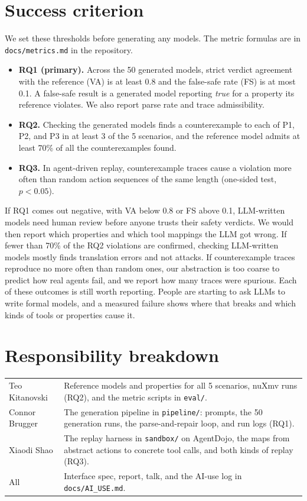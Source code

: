\documentclass[10pt]{article}
\newcommand{\memberA}{Teo Kitanovski}
\newcommand{\memberB}{Connor Brugger}
\newcommand{\memberC}{Xiaodi Shao}
\begin{document}
\section{Success criterion}
We set these thresholds before generating any models. The metric formulas are in
\texttt{docs/metrics.md} in the repository.
\begin{itemize}
\item \textbf{RQ1 (primary).} Across the 50 generated models, strict verdict agreement with the
  reference (VA) is at least 0.8 and the false-safe rate (FS) is at most 0.1. A false-safe result is
  a generated model reporting \emph{true} for a property its reference violates. We also report
  parse rate and trace admissibility.
\item \textbf{RQ2.} Checking the generated models finds a counterexample to each of P1, P2, and P3
  in at least 3 of the 5 scenarios, and the reference model admits at least 70\% of all the
  counterexamples found.
\item \textbf{RQ3.} In agent-driven replay, counterexample traces cause a violation more often than
  random action sequences of the same length (one-sided test, $p < 0.05$).
\end{itemize}
If RQ1 comes out negative, with VA below 0.8 or FS above 0.1, LLM-written models need human review
before anyone trusts their safety verdicts. We would then report which properties and which tool
mappings the LLM got wrong. If fewer than 70\% of the RQ2 violations are confirmed, checking
LLM-written models mostly finds translation errors and not attacks. If counterexample traces
reproduce no more often than random ones, our abstraction is too coarse to predict how real agents
fail, and we report how many traces were spurious. Each of these outcomes is still worth
reporting. People are starting to ask LLMs to write formal models, and a measured failure shows
where that breaks and which kinds of tools or properties cause it.

\section{Responsibility breakdown}
\begin{tabularx}{\linewidth}{@{}lX@{}}
\toprule
\memberA & Reference models and properties for all 5 scenarios, nuXmv runs (RQ2), and the metric scripts in \texttt{eval/}. \\
\memberB & The generation pipeline in \texttt{pipeline/}: prompts, the 50 generation runs, the parse-and-repair loop, and run logs (RQ1). \\
\memberC & The replay harness in \texttt{sandbox/} on AgentDojo, the maps from abstract actions to concrete tool calls, and both kinds of replay (RQ3). \\
All & Interface spec, report, talk, and the AI-use log in \texttt{docs/AI\_USE.md}. \\
\bottomrule
\end{tabularx}
\end{document}
